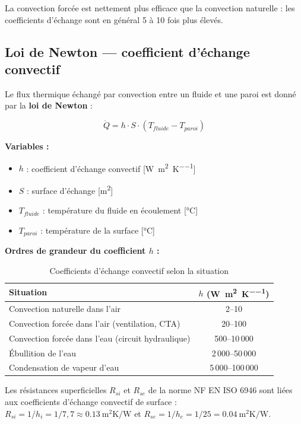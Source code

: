 La convection forcée est nettement plus efficace que la convection naturelle : les coefficients
d'échange sont en général \num{5} à \num{10} fois plus élevés.

\subsection{Loi de Newton — coefficient d'échange convectif}

Le flux thermique échangé par convection entre un fluide et une paroi est donné par la
\textbf{loi de Newton} :

\begin{equation}
  \dot{Q} = h \cdot S \cdot (T_{fluide} - T_{paroi})
  \label{eq:newton_convection}
\end{equation}

\textbf{Variables :}
\begin{itemize}
  \item \(h\) : coefficient d'échange convectif [\si{\watt\per\meter\squared\per\kelvin}]
  \item \(S\) : surface d'échange [\si{\meter\squared}]
  \item \(T_{fluide}\) : température du fluide en écoulement [\si{\degreeCelsius}]
  \item \(T_{paroi}\) : température de la surface [\si{\degreeCelsius}]
\end{itemize}

\textbf{Ordres de grandeur du coefficient \(h\) :}

\begin{table}[H]
  \centering
  \caption{Coefficients d'échange convectif selon la situation}
  \begin{tabular}{lc}
    \toprule
    Situation & \(h\) (\si{\watt\per\meter\squared\per\kelvin}) \\
    \midrule
    Convection naturelle dans l'air & 2–10 \\
    Convection forcée dans l'air (ventilation, CTA) & 20–100 \\
    Convection forcée dans l'eau (circuit hydraulique) & 500–10\,000 \\
    Ébullition de l'eau & 2\,000–50\,000 \\
    Condensation de vapeur d'eau & 5\,000–100\,000 \\
    \bottomrule
  \end{tabular}
\end{table}

Les résistances superficielles \(R_{si}\) et \(R_{se}\) de la norme NF EN ISO 6946 sont
liées aux coefficients d'échange convectif de surface :
\(R_{si} = 1/h_i = 1/7{,}7 \approx \SI{0,13}{\meter\squared\kelvin\per\watt}\) et
\(R_{se} = 1/h_e = 1/25 = \SI{0,04}{\meter\squared\kelvin\per\watt}\).

